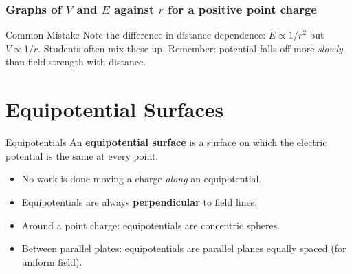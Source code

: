 \subsubsection*{Graphs of $V$ and $E$ against $r$ for a positive point charge}

\begin{center}
\end{center}

\begin{warningbox}{Common Mistake}
Note the difference in distance dependence: $E \propto 1/r^2$ but $V \propto 1/r$. Students often mix these up. Remember: potential falls off more \emph{slowly} than field strength with distance.
\end{warningbox}

\section{Equipotential Surfaces}

\begin{definitionbox}{Equipotentials}
An \textbf{equipotential surface} is a surface on which the electric potential is the same at every point.
\begin{itemize}[itemsep=2pt]
  \item No work is done moving a charge \emph{along} an equipotential.
  \item Equipotentials are always \textbf{perpendicular} to field lines.
  \item Around a point charge: equipotentials are concentric spheres.
  \item Between parallel plates: equipotentials are parallel planes equally spaced (for uniform field).
\end{itemize}
\end{definitionbox}

